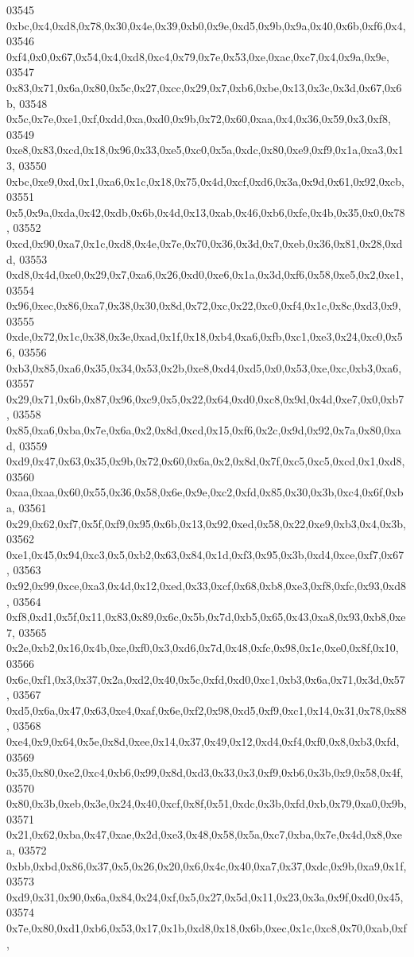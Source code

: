 \begin{DoxyCode}
03545   0xbc,0x4,0xd8,0x78,0x30,0x4e,0x39,0xb0,0x9e,0xd5,0x9b,0x9a,0x40,0x6b,0xf6,0x4,
03546   0xf4,0x0,0x67,0x54,0x4,0xd8,0xc4,0x79,0x7e,0x53,0xe,0xac,0xc7,0x4,0x9a,0x9e,
03547   0x83,0x71,0x6a,0x80,0x5c,0x27,0xcc,0x29,0x7,0xb6,0xbe,0x13,0x3c,0x3d,0x67,0x6b,
03548   0x5c,0x7e,0xe1,0xf,0xdd,0xa,0xd0,0x9b,0x72,0x60,0xaa,0x4,0x36,0x59,0x3,0xf8,
03549   0xe8,0x83,0xcd,0x18,0x96,0x33,0xe5,0xc0,0x5a,0xdc,0x80,0xe9,0xf9,0x1a,0xa3,0x13,
03550   0xbc,0xe9,0xd,0x1,0xa6,0x1c,0x18,0x75,0x4d,0xcf,0xd6,0x3a,0x9d,0x61,0x92,0xcb,
03551   0x5,0x9a,0xda,0x42,0xdb,0x6b,0x4d,0x13,0xab,0x46,0xb6,0xfe,0x4b,0x35,0x0,0x78,
03552   0xcd,0x90,0xa7,0x1c,0xd8,0x4e,0x7e,0x70,0x36,0x3d,0x7,0xeb,0x36,0x81,0x28,0xdd,
03553   0xd8,0x4d,0xe0,0x29,0x7,0xa6,0x26,0xd0,0xe6,0x1a,0x3d,0xf6,0x58,0xe5,0x2,0xe1,
03554   0x96,0xec,0x86,0xa7,0x38,0x30,0x8d,0x72,0xc,0x22,0xc0,0xf4,0x1c,0x8c,0xd3,0x9,
03555   0xde,0x72,0x1c,0x38,0x3e,0xad,0x1f,0x18,0xb4,0xa6,0xfb,0xc1,0xe3,0x24,0xc0,0x56,
03556   0xb3,0x85,0xa6,0x35,0x34,0x53,0x2b,0xe8,0xd4,0xd5,0x0,0x53,0xe,0xc,0xb3,0xa6,
03557   0x29,0x71,0x6b,0x87,0x96,0xc9,0x5,0x22,0x64,0xd0,0xc8,0x9d,0x4d,0xe7,0x0,0xb7,
03558   0x85,0xa6,0xba,0x7e,0x6a,0x2,0x8d,0xcd,0x15,0xf6,0x2c,0x9d,0x92,0x7a,0x80,0xad,
03559   0xd9,0x47,0x63,0x35,0x9b,0x72,0x60,0x6a,0x2,0x8d,0x7f,0xc5,0xc5,0xcd,0x1,0xd8,
03560   0xaa,0xaa,0x60,0x55,0x36,0x58,0x6e,0x9e,0xc2,0xfd,0x85,0x30,0x3b,0xc4,0x6f,0xba,
03561   0x29,0x62,0xf7,0x5f,0xf9,0x95,0x6b,0x13,0x92,0xed,0x58,0x22,0xe9,0xb3,0x4,0x3b,
03562   0xe1,0x45,0x94,0xc3,0x5,0xb2,0x63,0x84,0x1d,0xf3,0x95,0x3b,0xd4,0xce,0xf7,0x67,
03563   0x92,0x99,0xce,0xa3,0x4d,0x12,0xed,0x33,0xcf,0x68,0xb8,0xe3,0xf8,0xfc,0x93,0xd8,
03564   0xf8,0xd1,0x5f,0x11,0x83,0x89,0x6c,0x5b,0x7d,0xb5,0x65,0x43,0xa8,0x93,0xb8,0xe7,
03565   0x2e,0xb2,0x16,0x4b,0xe,0xf0,0x3,0xd6,0x7d,0x48,0xfc,0x98,0x1c,0xe0,0x8f,0x10,
03566   0x6c,0xf1,0x3,0x37,0x2a,0xd2,0x40,0x5c,0xfd,0xd0,0xc1,0xb3,0x6a,0x71,0x3d,0x57,
03567   0xd5,0x6a,0x47,0x63,0xe4,0xaf,0x6e,0xf2,0x98,0xd5,0xf9,0xc1,0x14,0x31,0x78,0x88,
03568   0xe4,0x9,0x64,0x5e,0x8d,0xee,0x14,0x37,0x49,0x12,0xd4,0xf4,0xf0,0x8,0xb3,0xfd,
03569   0x35,0x80,0xe2,0xc4,0xb6,0x99,0x8d,0xd3,0x33,0x3,0xf9,0xb6,0x3b,0x9,0x58,0x4f,
03570   0x80,0x3b,0xeb,0x3e,0x24,0x40,0xcf,0x8f,0x51,0xdc,0x3b,0xfd,0xb,0x79,0xa0,0x9b,
03571   0x21,0x62,0xba,0x47,0xae,0x2d,0xe3,0x48,0x58,0x5a,0xc7,0xba,0x7e,0x4d,0x8,0xea,
03572   0xbb,0xbd,0x86,0x37,0x5,0x26,0x20,0x6,0x4c,0x40,0xa7,0x37,0xdc,0x9b,0xa9,0x1f,
03573   0xd9,0x31,0x90,0x6a,0x84,0x24,0xf,0x5,0x27,0x5d,0x11,0x23,0x3a,0x9f,0xd0,0x45,
03574   0x7e,0x80,0xd1,0xb6,0x53,0x17,0x1b,0xd8,0x18,0x6b,0xec,0x1c,0xc8,0x70,0xab,0xf,

\end{DoxyCode}
